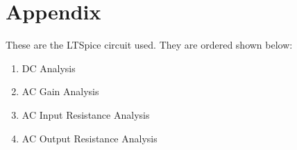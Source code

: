 \documentclass{article}
\begin{document}
\clearpage{}

\printbibliography{}

\clearpage{}

\section{Appendix}

These are the LTSpice circuit used.
They are ordered shown below:
\begin{enumerate}
    \item DC Analysis
    \item AC Gain Analysis
    \item AC Input Resistance Analysis
    \item AC Output Resistance Analysis
\end{enumerate}





\end{document}
